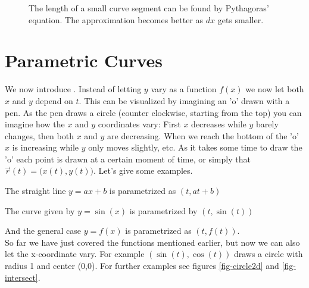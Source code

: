 \begin{figure}[h]
\begin{center}

\caption{\small The length of a small curve segment can be found by Pythagoras' equation. The 
approximation becomes better as $dx$ gets smaller.}
\label{fig-delta_l}
\end{center}
\end{figure}


\section{Parametric Curves}

We now introduce . Instead of letting $y$ vary as a function $f(x)$ we now 
let both $x$ and $y$ depend on $t$. This can be visualized by imagining an 'o' drawn with a pen. 
As the pen draws a circle (counter clockwise, starting from the top) you can imagine how the $x$ and $y$ coordinates vary:
First $x$ decreases while $y$ barely changes, then both $x$ and $y$ are decreasing. When we reach the bottom of
the 'o' $x$ is increasing while $y$ only moves slightly, etc. As it takes some time to draw the 'o'
each point is drawn at a certain moment of time, or simply that $\vec{r}(t)= \Big( x(t), y(t) \Big)$.
Let's give some examples. 

The straight line $y=ax+b$ is parametrized as $(t, at+b)$

The curve  given by $y=\sin(x)$ is parametrized by $(t, \sin(t))$

And the general case $y=f(x)$ is parametrized as $(t, f(t))$.\\

So far we have just covered the functions mentioned earlier, but now we can also let the x-coordinate 
vary. For example $(\sin(t),\cos(t))$ draws a circle with radius 1 and center (0,0). For further examples 
see figures \ref{fig-circle2d} and \ref{fig-intersect}.



